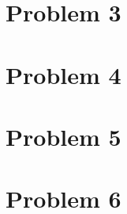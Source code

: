 \documentclass{scrartcl}
\begin{document}
\section{Problem 3}
\section{Problem 4}
\section{Problem 5}
\section{Problem 6}
\end{document}
